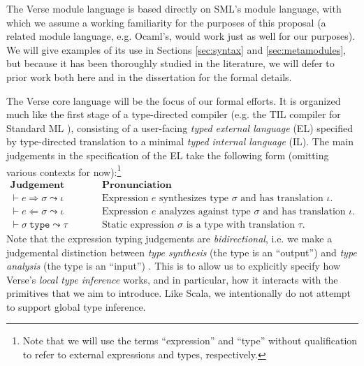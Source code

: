 The Verse module language is based directly on SML's module language, with which we assume a working familiarity for the purposes of this proposal \cite{harper1997programming,MacQueen:1984:MSM:800055.802036} (a related module language, e.g. Ocaml's, would work just as well for our purposes). We will give examples of its use in Sections \ref{sec:syntax} and \ref{sec:metamodules}, but because it has been thoroughly studied in the literature, we will defer to prior work both here and in the dissertation for the formal details.%

The Verse core language will be the focus of our formal efforts. It is organized much like the first stage of a type-directed compiler (e.g. the TIL compiler for Standard ML \cite{tarditi+:til-OLD}), consisting of a user-facing \emph{typed external language} (EL) specified by type-directed translation to a minimal \emph{typed internal language} (IL). The main judgements in the specification of the EL take the following form  (omitting various contexts for now):\footnote{Note that we will use the terms ``expression'' and ``type'' without qualification to refer to  external expressions and types, respectively. }
\\[1ex]
$\begin{array}{ll}
\textbf{Judgement Form} & \textbf{Pronunciation}\\
\vdash e \Rightarrow \sigma \leadsto \iota & \text{Expression $e$ synthesizes type $\sigma$ and has translation $\iota$.}\\
\vdash e \Leftarrow \sigma \leadsto \iota & \text{Expression $e$ analyzes against type $\sigma$ and has translation $\iota$.}\\
\vdash \sigma~\mathtt{type} \leadsto \tau & \text{Static expression $\sigma$ is a type with translation $\tau$.}
\end{array}
$\\[1ex]
Note that the expression typing judgements are \emph{bidirectional}, i.e. we make a judgemental distinction between \emph{type synthesis} (the type is an ``output'') and \emph{type analysis} (the type is an ``input'') \cite{Pierce:2000:LTI:345099.345100}. This is to  allow us to explicitly specify how Verse's \emph{local type inference} works, and in particular, how it interacts with the primitives that we aim to introduce. Like Scala, we intentionally do not attempt to support global type inference.%

